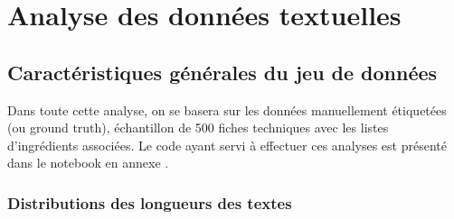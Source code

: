 \part{Analyse des données textuelles}

    \chapter{Caractéristiques générales du jeu de données}

        Dans toute cette analyse, on se basera sur les données manuellement étiquetées (ou ground truth), échantillon de 500 fiches techniques avec les listes d'ingrédients associées.
        Le code ayant servi à effectuer ces analyses est présenté dans le notebook en annexe .

        \section{Distributions des longueurs des textes}

